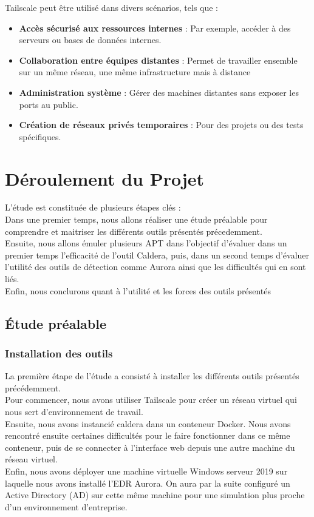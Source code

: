 \documentclass[12pt,letterpaper]{article}
\begin{document}
Tailscale peut être utilisé dans divers scénarios, tels que :
\begin{itemize}
    \item \textbf{Accès sécurisé aux ressources internes} : Par exemple, accéder à des serveurs ou bases de données internes.
    \item \textbf{Collaboration entre équipes distantes} : Permet de travailler ensemble sur un même réseau, une même infrastructure mais à distance
    \item \textbf{Administration système} : Gérer des machines distantes sans exposer les ports au public.
    \item \textbf{Création de réseaux privés temporaires} : Pour des projets ou des tests spécifiques.
\end{itemize}

\section{Déroulement du Projet}

L'étude est constituée de plusieurs étapes clés : \\
Dans une premier temps, nous allons réaliser une étude préalable pour comprendre et maitriser les différents outils présentés précedemment. \\
Ensuite, nous allons émuler plusieurs APT dans l'objectif d'évaluer dans un premier temps l'efficacité de l'outil Caldera, puis, dans un second temps d'évaluer l'utilité des outils de détection comme Aurora ainsi que les difficultés qui en sont liés. \\
Enfin, nous conclurons quant à l'utilité et les forces des outils présentés 

\subsection{Étude préalable}

\subsubsection{Installation des outils}

La première étape de l'étude a consisté à installer les différents outils présentés précédemment. \\

Pour commencer, nous avons utiliser Tailscale pour créer un réseau virtuel qui nous sert d'environnement de travail. \\
Ensuite, nous avons instancié caldera dans un conteneur Docker. Nous avons rencontré ensuite certaines difficultés pour le faire fonctionner dans ce même conteneur, puis de se connecter à l'interface web depuis une autre machine du réseau virtuel. \\
Enfin, nous avons déployer une machine virtuelle Windows serveur 2019 sur laquelle nous avons installé l'EDR Aurora. On aura par la suite configuré un Active Directory (AD) sur cette même machine pour une simulation plus proche d'un environnement d'entreprise.
\end{document}
